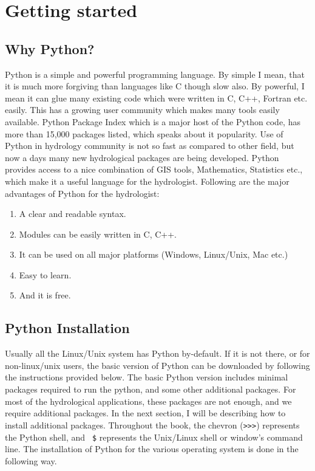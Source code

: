 \documentclass[10pt]{book}
\begin{document}
\mainmatter


\chapter{Getting started}

\section{Why Python?}
Python is a simple and powerful programming language. By simple I mean, that it is much more forgiving than languages like C though slow also. By powerful, I mean it can glue many existing code which were written in C, C++, Fortran etc. easily. This has a growing user community which makes many tools easily available. Python Package Index which is a major host of the Python code, has more than 15,000 packages listed, which speaks about it popularity. Use of Python in hydrology community is not so fast as compared to other field, but now a days many new hydrological packages are being developed. Python provides access to a nice combination of GIS tools, Mathematics, Statistics etc., which make it a useful language for the hydrologist. Following are the major advantages of Python for the hydrologist:
\begin{enumerate}
\item A clear and readable syntax. \
\item Modules can be easily written in C, C++. \
\item It can be used on all major platforms (Windows, Linux/Unix, Mac etc.) \
\item Easy to learn. \
\item And it is free. \
\end{enumerate}

\section{Python Installation}
Usually all the Linux/Unix system has Python by-default. If it is not there, or for non-linux/unix users, the basic version of Python can be downloaded by following the instructions provided below. The basic Python version includes minimal packages required to run the python, and some other additional packages. For most of the hydrological applications, these packages are not enough, and we require additional packages. In the next section, I will be describing how to install additional packages. Throughout the book, the chevron (\verb">>>") represents the Python shell, and {\verb" $"} represents the Unix/Linux shell or window's command line. The installation of Python for the various operating system is done in the following way. 
\end{document}
